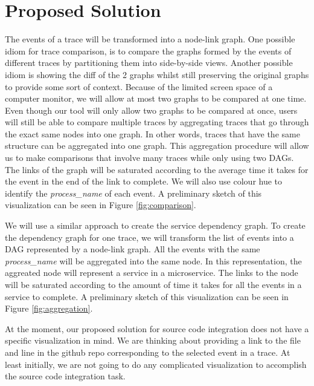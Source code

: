 \section{Proposed Solution}

The events of a trace will be transformed into a node-link graph. One possible idiom for trace comparison, is to compare the graphs formed by the events of different traces
by partitioning them into side-by-side views. Another possible idiom is showing the diff of the 2 graphs whilst still preserving
the original graphs to provide some sort of context.
Because of the limited screen space of a computer monitor, we will allow at most two
graphs to be compared at one time. Even though our tool will only allow two graphs to be compared at once, users will still be able
to compare multiple traces by aggregating traces that go through the exact same nodes into one graph. In other words, traces that have
the same structure can be aggregated into one graph. This aggregation procedure will allow us to make comparisons that involve many
traces while only using two DAGs. The links of the graph will be saturated according to the average time it takes for the event in
the end of the link to complete. We will also use colour hue to identify the \textit{process\_name} of each event. A preliminary sketch of
this visualization can be seen in Figure \ref{fig:comparison}.

We will use a similar approach to create the service dependency graph. To create the dependency graph for one trace, we will transform the list
of events into a DAG represented by a node-link graph. All the events with the same \textit{process\_name} will be aggregated into the same
node. In this representation, the aggreated node will represent a service in a microservice. The links to the node will be saturated according
to the amount of time it takes for all the events in a service to complete. A preliminary sketch of this visualization can be seen in Figure \ref{fig:aggregation}.

At the moment, our proposed solution for source code integration does not have a specific visualization in mind. We are thinking about
providing a link to the file and line in the github repo corresponding to the selected event in a trace. At least initially, we are not
going to do any complicated visualization to accomplish the source code integration task.

